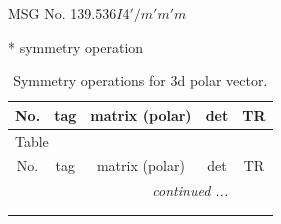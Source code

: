 \documentclass[fleqn,8pt]{jsarticle}
\begin{document}
\setcounter{MaxMatrixCols}{32}

\renewcommand{\tablename}{Table~}
\renewcommand{\figurename}{Figure~}
\begin{center}
\LARGE
MSG No. 139.536\quad$I4'/m'm'm$
\end{center}
* symmetry operation
\renewcommand{\arraystretch}{1.3}
\begin{longtable}{ccccc}
\caption{Symmetry operations for 3d polar vector.}
 \\
 \hline \hline
No. & tag & matrix (polar) & det & TR \\ \hline \endfirsthead

\multicolumn{4}{l}{\tablename\ \thetable{}} \\
 \hline \hline
No. & tag & matrix (polar) & det & TR \\ \hline \endhead

 \hline \hline
\multicolumn{4}{r}{\footnotesize\it continued ...} \\ \endfoot

 \hline \hline
\multicolumn{4}{r}{} \\ \endlastfoot


\end{longtable}
\end{document}
